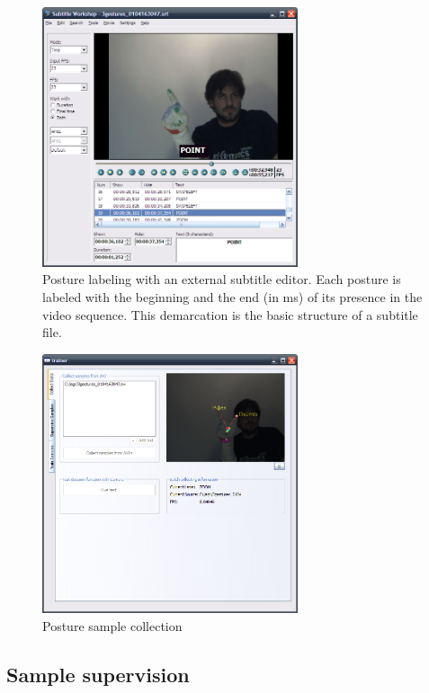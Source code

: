 \begin{figure}[H]
\center
\includegraphics[width=0.67\textwidth]{images/subtitle-editor} 
\caption{Posture labeling with an external subtitle editor. Each posture is labeled with the beginning and the end (in ms) of its presence in the video sequence. This demarcation is the basic structure of a subtitle file. }
\label{fig:subtitle-editor}
\end{figure}

\begin{figure}[H]
\center
\includegraphics[width=0.67\textwidth]{images/collect-samples} 
\caption{Posture sample collection}
\label{fig:collect-samples}
\end{figure}

\subsection{Sample supervision}
\label{sub:sample-supervision}

